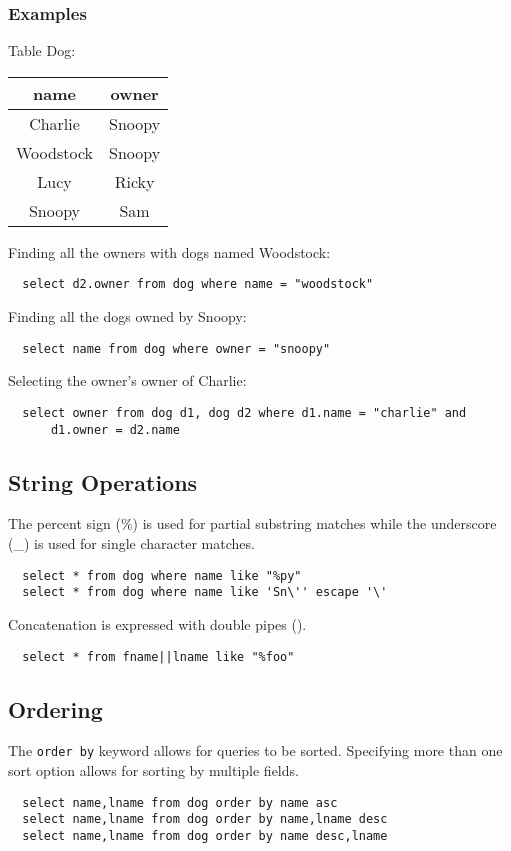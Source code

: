 \documentclass{math}
\begin{document}
\subsubsection*{Examples}
\begin{center}
  Table Dog: \\
  \begin{tabular}{|c|c|}
    \hline
    name & owner \\
    \hline
    Charlie & Snoopy \\
    Woodstock & Snoopy \\
    Lucy & Ricky \\
    Snoopy & Sam \\
    \hline
  \end{tabular}
\end{center}
Finding all the owners with dogs named Woodstock:
\begin{lstlisting}
  select d2.owner from dog where name = "woodstock"
\end{lstlisting}
Finding all the dogs owned by Snoopy:
\begin{lstlisting}
  select name from dog where owner = "snoopy"
\end{lstlisting}
Selecting the owner's owner of Charlie:
\begin{lstlisting}
  select owner from dog d1, dog d2 where d1.name = "charlie" and
      d1.owner = d2.name
\end{lstlisting}

\subsection*{String Operations}
The percent sign (\%) is used for partial substring matches while the
underscore (\_) is used for single character matches.
\begin{lstlisting}
  select * from dog where name like "%py"
  select * from dog where name like 'Sn\'' escape '\'
\end{lstlisting}
Concatenation is expressed with double pipes (\textbar\textbar).
\begin{lstlisting}
  select * from fname||lname like "%foo"
\end{lstlisting}

\subsection*{Ordering}
The \texttt{order by} keyword allows for queries to be sorted. Specifying more
than one sort option allows for sorting by multiple fields.
\begin{lstlisting}
  select name,lname from dog order by name asc
  select name,lname from dog order by name,lname desc
  select name,lname from dog order by name desc,lname
\end{lstlisting}
\end{document}
